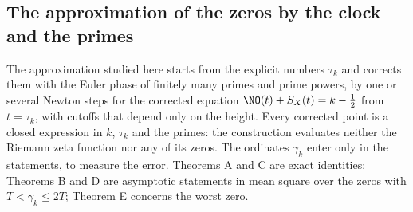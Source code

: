 \subsection{The approximation of the zeros by the clock and the primes}
\label{subsec:program}
The approximation studied here starts from the explicit numbers $\tau_k$ and corrects them with the Euler phase of finitely many primes and prime powers, by one or several Newton steps for the corrected equation $\NO(t)+S_X(t)=k-\frac12$ from $t=\tau_k$, with cutoffs that depend only on the height. Every corrected point is a closed expression in $k$, $\tau_k$ and the primes: the construction evaluates neither the Riemann zeta function nor any of its zeros. The ordinates $\gamma_k$ enter only in the statements, to measure the error. Theorems A and C are exact identities; Theorems B and D are asymptotic statements in mean square over the zeros with $T<\gamma_k\le2T$; Theorem E concerns the worst zero.

